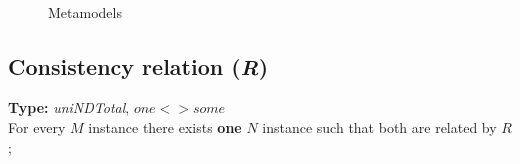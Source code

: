 \documentclass{article}
\begin{document}
\begin{figure}[ht]
    \centering
    \mbox{\qquad\qquad
          }
    \caption{Metamodels}
    \label{fig:Meta}
\end{figure}


\subsection{Consistency relation (\textit{R})}
\label{sec:CR}

\textbf{Type:} \textit{uniNDTotal},  $one <> some$\\

For every $M$ instance there
exists \textbf{one} $N$ instance such that both are related by $R$;
\end{document}
